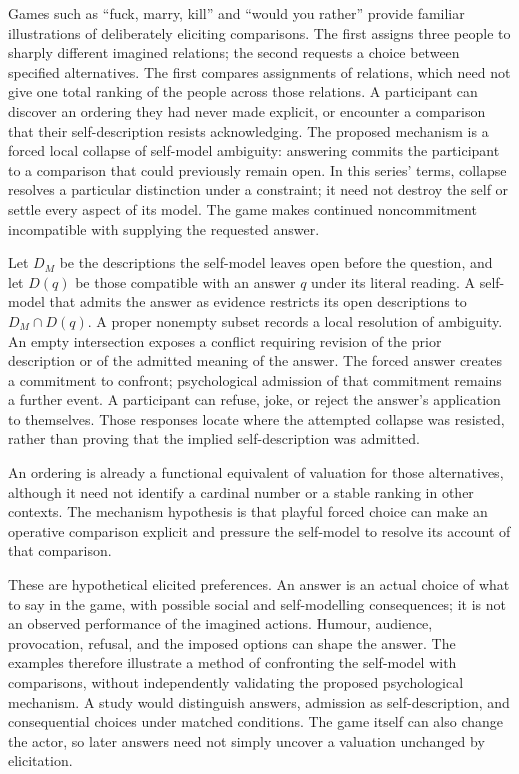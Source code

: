 \documentclass[11pt,a4paper]{article}
\theoremstyle{remark}
\begin{document}
Games such as ``fuck, marry, kill'' and ``would you rather'' provide familiar
illustrations of deliberately eliciting comparisons. The first assigns three
people to sharply different imagined relations; the second requests a choice
between specified alternatives. The first compares assignments of relations,
which need not give one total ranking of the people across those relations. A participant can discover an ordering they
had never made explicit, or encounter a comparison that their self-description
resists acknowledging. The proposed mechanism is a forced local collapse of
self-model ambiguity: answering commits the participant to a comparison that
could previously remain open. In this series' terms, collapse resolves a
particular distinction under a constraint; it need not destroy the self or
settle every aspect of its model. The game makes continued noncommitment
incompatible with supplying the requested answer.

Let $D_M$ be the descriptions the self-model leaves open before the question,
and let $D(q)$ be those compatible with an answer $q$ under its literal reading.
A self-model that admits the answer as evidence restricts its open descriptions
to $D_M\cap D(q)$. A proper nonempty subset records a local resolution of
ambiguity. An empty intersection exposes a conflict requiring revision of the
prior description or of the admitted meaning of the answer. The forced answer
creates a commitment to confront; psychological admission of that commitment
remains a further event. A participant can refuse, joke, or reject the answer's
application to themselves. Those responses locate where the attempted collapse
was resisted, rather than proving that the implied self-description was admitted.

An ordering is already a functional equivalent of valuation for those
alternatives, although it need not identify a cardinal number or a stable ranking
in other contexts. The mechanism hypothesis is that playful forced choice can
make an operative comparison explicit and pressure the self-model to resolve
its account of that comparison.

These are hypothetical elicited preferences. An answer is an actual choice of
what to say in the game, with possible social and self-modelling consequences;
it is not an observed performance of the imagined actions. Humour, audience,
provocation, refusal, and the imposed options can shape the answer. The examples
therefore illustrate a method of confronting the self-model with comparisons,
without independently validating the proposed psychological mechanism. A study
would distinguish answers, admission as self-description, and consequential
choices under matched conditions. The game itself can also change the actor,
so later answers need not simply uncover a valuation unchanged by elicitation.
\end{document}
